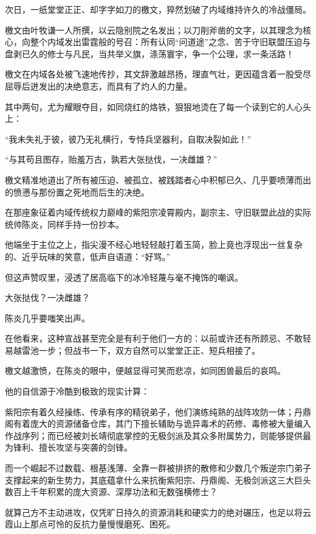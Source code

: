 
\vspace{2em}

次日，一纸堂堂正正、却字字如刀的檄文，猝然划破了内域维持许久的冷战僵局。

檄文由叶牧谦一人所撰，以云隐别院之名发出；以刀削斧凿的文字，以其理念为核心，向整个内域发出雷霆般的号召：所有认同“问道途”之念、苦于守旧联盟压迫与盘剥已久的修士与凡民，当共举义旗，涤荡寰宇，争一个公理，求一条活路！

檄文在内域各处被飞速地传抄，其文辞激越昂扬，理直气壮，更因蕴含着一股受尽屈辱后迸发出的决绝意志，而具有了灼人的力量。

其中两句，尤为耀眼夺目，如同烧红的烙铁，狠狠地烫在了每一个读到它的人心头上：

“我未失礼于彼，彼乃无礼横行，专恃兵坚器利，自取决裂如此！”

“与其苟且图存，贻羞万古，孰若大张挞伐，一决雌雄？”

檄文精准地道出了所有被压迫、被孤立、被践踏者心中积郁已久、几乎要喷薄而出的愤懑与那份置之死地而后生的决绝。

\vspace{2em}

在那座象征着内域传统权力巅峰的紫阳宗凌霄殿内，副宗主、守旧联盟此战的实际统帅陈炎，同样手持一份抄本。

他端坐于主位之上，指尖漫不经心地轻轻敲打着玉简，脸上竟也浮现出一丝复杂的、近乎玩味的笑意，低声自语道：“好骂。”

但这声赞叹里，浸透了居高临下的冰冷轻蔑与毫不掩饰的嘲讽。

大张挞伐？一决雌雄？

陈炎几乎要嗤笑出声。

在他看来，这种宣战甚至完全是有利于他们一方的：以前或许还有所顾忌、不敢轻易越雷池一步；但战书一下，双方自然可以堂堂正正、短兵相接了。

檄文越激愤，在陈炎的眼中，便越显得可笑而悲凉，如同困兽最后的哀鸣。

他的自信源于冷酷到极致的现实计算：

紫阳宗有着久经操练、传承有序的精锐弟子，他们演练纯熟的战阵攻防一体；丹鼎阁有着庞大的资源储备仓库，其门下擅长辅助与诡异毒术的药修、毒修被大量编入作战序列；而已经被刘长靖彻底掌控的无极剑派及其众多附属势力，则能够提供最为锋利、擅长攻坚与突袭的剑锋。

而一个崛起不过数载、根基浅薄、全靠一群被排挤的散修和少数几个叛逆宗门弟子支撑起来的新生势力，其底蕴拿什么来抗衡紫阳宗、丹鼎阁、无极剑派这三大巨头数百上千年积累的庞大资源、深厚功法和无数强横修士？

就算己方不主动进攻，仅凭旷日持久的资源消耗和硬实力的绝对碾压，也足以将云霞山上那点可怜的反抗力量慢慢磨死、困死。

